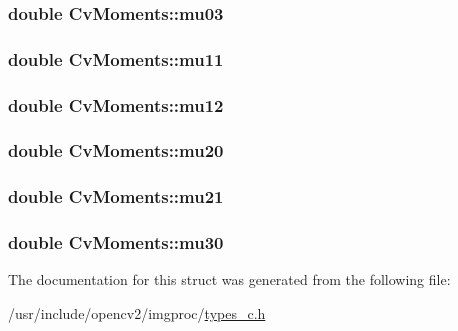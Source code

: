 \hypertarget{structCvMoments_a4bc33c2f551d6a3e847eb1c1863e6e60}{
\subsubsection[{mu03}]{\setlength{\rightskip}{0pt plus 5cm}double Cv\-Moments\-::mu03}}\label{structCvMoments_a4bc33c2f551d6a3e847eb1c1863e6e60}
\hypertarget{structCvMoments_a029e8765b2dabc92ced26c18ae7f6439}{
\subsubsection[{mu11}]{\setlength{\rightskip}{0pt plus 5cm}double Cv\-Moments\-::mu11}}\label{structCvMoments_a029e8765b2dabc92ced26c18ae7f6439}
\hypertarget{structCvMoments_a339627399f6f3a6d10a7ae2a38d2a8ea}{
\subsubsection[{mu12}]{\setlength{\rightskip}{0pt plus 5cm}double Cv\-Moments\-::mu12}}\label{structCvMoments_a339627399f6f3a6d10a7ae2a38d2a8ea}
\hypertarget{structCvMoments_aa20e267058657184b5ca4c5491c12e10}{
\subsubsection[{mu20}]{\setlength{\rightskip}{0pt plus 5cm}double Cv\-Moments\-::mu20}}\label{structCvMoments_aa20e267058657184b5ca4c5491c12e10}
\hypertarget{structCvMoments_a429d624a00bc859472d13a68ce073f85}{
\subsubsection[{mu21}]{\setlength{\rightskip}{0pt plus 5cm}double Cv\-Moments\-::mu21}}\label{structCvMoments_a429d624a00bc859472d13a68ce073f85}
\hypertarget{structCvMoments_a8c4cfe0c724576018e73b2ec7a724470}{
\subsubsection[{mu30}]{\setlength{\rightskip}{0pt plus 5cm}double Cv\-Moments\-::mu30}}\label{structCvMoments_a8c4cfe0c724576018e73b2ec7a724470}


The documentation for this struct was generated from the following file\-:\begin{DoxyCompactItemize}
\item 
/usr/include/opencv2/imgproc/\hyperlink{imgproc_2types__c_8h}{types\-\_\-c.\-h}\end{DoxyCompactItemize}
